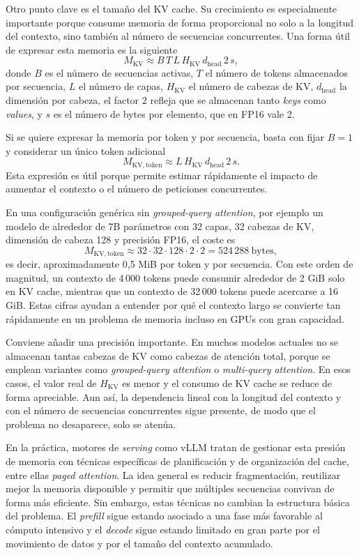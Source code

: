 Otro punto clave es el tamaño del KV cache. Su crecimiento es especialmente importante porque consume memoria de forma proporcional no solo a la longitud del contexto, sino también al número de secuencias concurrentes. Una forma útil de expresar esta memoria es la siguiente
\[
M_{\mathrm{KV}} \approx B \, T \, L \, H_{\mathrm{KV}} \, d_{\mathrm{head}} \, 2 \, s,
\]
donde $B$ es el número de secuencias activas, $T$ el número de tokens almacenados por secuencia, $L$ el número de capas, $H_{\mathrm{KV}}$ el número de cabezas de KV, $d_{\mathrm{head}}$ la dimensión por cabeza, el factor $2$ refleja que se almacenan tanto \textit{keys} como \textit{values}, y $s$ es el número de bytes por elemento, que en FP16 vale 2.

Si se quiere expresar la memoria por token y por secuencia, basta con fijar $B=1$ y considerar un único token adicional
\[
M_{\mathrm{KV,token}} \approx L \, H_{\mathrm{KV}} \, d_{\mathrm{head}} \, 2 \, s.
\]
Esta expresión es útil porque permite estimar rápidamente el impacto de aumentar el contexto o el número de peticiones concurrentes.

En una configuración genérica sin \textit{grouped-query attention}, por ejemplo un modelo de alrededor de 7B parámetros con 32 capas, 32 cabezas de KV, dimensión de cabeza 128 y precisión FP16, el coste es
\[
M_{\mathrm{KV,token}} \approx 32 \cdot 32 \cdot 128 \cdot 2 \cdot 2
= 524\,288\ \text{bytes},
\]
es decir, aproximadamente 0,5 MiB por token y por secuencia. Con este orden de magnitud, un contexto de 4\,000 tokens puede consumir alrededor de 2 GiB solo en KV cache, mientras que un contexto de 32\,000 tokens puede acercarse a 16 GiB. Estas cifras ayudan a entender por qué el contexto largo se convierte tan rápidamente en un problema de memoria incluso en GPUs con gran capacidad.

Conviene añadir una precisión importante. En muchos modelos actuales no se almacenan tantas cabezas de KV como cabezas de atención total, porque se emplean variantes como \textit{grouped-query attention} o \textit{multi-query attention}. En esos casos, el valor real de $H_{\mathrm{KV}}$ es menor y el consumo de KV cache se reduce de forma apreciable. Aun así, la dependencia lineal con la longitud del contexto y con el número de secuencias concurrentes sigue presente, de modo que el problema no desaparece, solo se atenúa.

En la práctica, motores de \textit{serving} como vLLM tratan de gestionar esta presión de memoria con técnicas específicas de planificación y de organización del cache, entre ellas \textit{paged attention}. La idea general es reducir fragmentación, reutilizar mejor la memoria disponible y permitir que múltiples secuencias convivan de forma más eficiente. Sin embargo, estas técnicas no cambian la estructura básica del problema. El \textit{prefill} sigue estando asociado a una fase más favorable al cómputo intensivo y el \textit{decode} sigue estando limitado en gran parte por el movimiento de datos y por el tamaño del contexto acumulado.

